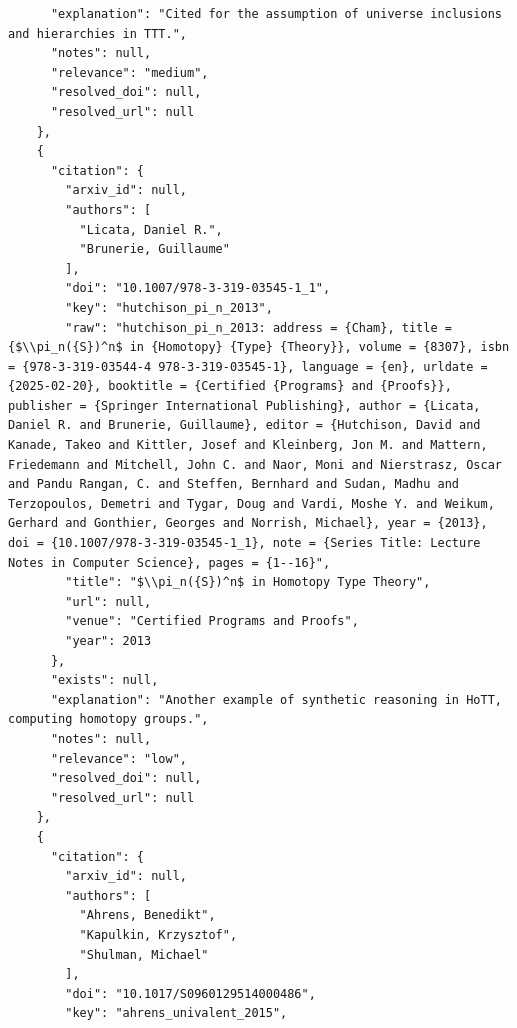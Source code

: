 \documentclass[11pt]{article}
\begin{document}
\begin{verbatim}
      "explanation": "Cited for the assumption of universe inclusions and hierarchies in TTT.",
      "notes": null,
      "relevance": "medium",
      "resolved_doi": null,
      "resolved_url": null
    },
    {
      "citation": {
        "arxiv_id": null,
        "authors": [
          "Licata, Daniel R.",
          "Brunerie, Guillaume"
        ],
        "doi": "10.1007/978-3-319-03545-1_1",
        "key": "hutchison_pi_n_2013",
        "raw": "hutchison_pi_n_2013: address = {Cham}, title = {$\\pi_n({S})^n$ in {Homotopy} {Type} {Theory}}, volume = {8307}, isbn = {978-3-319-03544-4 978-3-319-03545-1}, language = {en}, urldate = {2025-02-20}, booktitle = {Certified {Programs} and {Proofs}}, publisher = {Springer International Publishing}, author = {Licata, Daniel R. and Brunerie, Guillaume}, editor = {Hutchison, David and Kanade, Takeo and Kittler, Josef and Kleinberg, Jon M. and Mattern, Friedemann and Mitchell, John C. and Naor, Moni and Nierstrasz, Oscar and Pandu Rangan, C. and Steffen, Bernhard and Sudan, Madhu and Terzopoulos, Demetri and Tygar, Doug and Vardi, Moshe Y. and Weikum, Gerhard and Gonthier, Georges and Norrish, Michael}, year = {2013}, doi = {10.1007/978-3-319-03545-1_1}, note = {Series Title: Lecture Notes in Computer Science}, pages = {1--16}",
        "title": "$\\pi_n({S})^n$ in Homotopy Type Theory",
        "url": null,
        "venue": "Certified Programs and Proofs",
        "year": 2013
      },
      "exists": null,
      "explanation": "Another example of synthetic reasoning in HoTT, computing homotopy groups.",
      "notes": null,
      "relevance": "low",
      "resolved_doi": null,
      "resolved_url": null
    },
    {
      "citation": {
        "arxiv_id": null,
        "authors": [
          "Ahrens, Benedikt",
          "Kapulkin, Krzysztof",
          "Shulman, Michael"
        ],
        "doi": "10.1017/S0960129514000486",
        "key": "ahrens_univalent_2015",

\end{verbatim}
\end{document}
